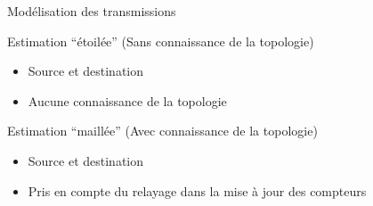 \begin{frame}{Modélisation des transmissions}
  \begin{figure}
    
  \end{figure}
  \begin{block}{Estimation ``étoilée'' (Sans connaissance de la topologie)}
    \begin{itemize}
      \item Source et destination
      \item Aucune connaissance de la topologie
    \end{itemize}
  \end{block}
  \begin{block}{Estimation ``maillée'' (Avec connaissance de la topologie)}
    \begin{itemize}
      \item Source et destination
      \item Pris en compte du relayage dans la mise à jour des compteurs
    \end{itemize}
  \end{block}
\end{frame}

\DeclarePairedDelimiter{\ceil}{\lceil}{\rceil}

